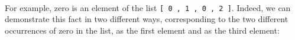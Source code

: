 \begin{fence}
\begin{code}%
\>[0]\AgdaSpace{}%
\AgdaSpace{}%
\AgdaSpace{}%
\<%
\\
%
\\[\AgdaEmptyExtraSkip]%
\>[0]\AgdaSpace{}%
\AgdaSymbol{:}\AgdaSpace{}%
\AgdaSpace{}%
\AgdaSymbol{\{}\AgdaSpace{}%
\AgdaSymbol{:}\AgdaSpace{}%
\AgdaSymbol{\}}\AgdaSpace{}%
\AgdaSymbol{(}\AgdaSpace{}%
\AgdaSymbol{:}\AgdaSpace{}%
\AgdaSymbol{)}\AgdaSpace{}%
\AgdaSymbol{(}\AgdaSpace{}%
\AgdaSymbol{:}\AgdaSpace{}%
\AgdaSpace{}%
\AgdaSymbol{)}\AgdaSpace{}%
\AgdaSpace{}%
\<%
\\
\>[0]\AgdaSpace{}%
\AgdaSpace{}%
\AgdaSpace{}%
\AgdaSymbol{=}\AgdaSpace{}%
\AgdaSpace{}%
\AgdaSymbol{(}\AgdaSpace{}%
\AgdaSymbol{)}\AgdaSpace{}%
\<%
\\
%
\\[\AgdaEmptyExtraSkip]%
\>[0]\AgdaSpace{}%
\AgdaSymbol{:}\AgdaSpace{}%
\AgdaSpace{}%
\AgdaSymbol{\{}\AgdaSpace{}%
\AgdaSymbol{:}\AgdaSpace{}%
\AgdaSymbol{\}}\AgdaSpace{}%
\AgdaSymbol{(}\AgdaSpace{}%
\AgdaSymbol{:}\AgdaSpace{}%
\AgdaSymbol{)}\AgdaSpace{}%
\AgdaSymbol{(}\AgdaSpace{}%
\AgdaSymbol{:}\AgdaSpace{}%
\AgdaSpace{}%
\AgdaSymbol{)}\AgdaSpace{}%
\AgdaSpace{}%
\<%
\\
\>[0]\AgdaSpace{}%
\AgdaSpace{}%
\AgdaSpace{}%
\AgdaSymbol{=}\AgdaSpace{}%
\AgdaSpace{}%
\AgdaSymbol{(}\AgdaSpace{}%
\AgdaSpace{}%
\AgdaSymbol{)}\<%
\end{code}
\end{fence}

For example, zero is an element of the list
\texttt{{[}\ 0\ ,\ 1\ ,\ 0\ ,\ 2\ {]}}. Indeed, we can demonstrate this
fact in two different ways, corresponding to the two different
occurrences of zero in the list, as the first element and as the third
element:

